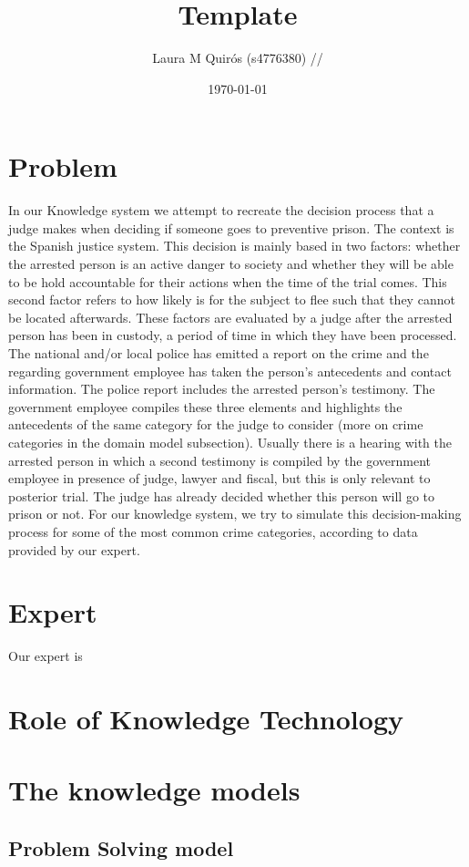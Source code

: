 \documentclass{article}
\title{Template}
\author{Laura M Quirós (s4776380) //}
\date{\today}
\begin{document}
\maketitle

\section{Problem}
In our Knowledge system we attempt to recreate the decision process that a judge makes when deciding if someone goes to preventive prison. The context is the Spanish justice system. This decision is mainly based in two factors: whether the arrested person is an active danger to society and whether they will be able to be hold accountable for their actions when the time of the trial comes. This second factor refers to how likely is for the subject to flee such that they cannot be located afterwards. 
These factors are evaluated by a judge after the arrested person has been in custody, a period of time in which they have been processed. The national and/or local police has emitted a report on the crime and the regarding government employee has taken the person's antecedents and contact information. The police report includes the arrested person's testimony.
The government employee compiles these three elements and highlights the antecedents of the same category for the judge to consider (more on crime categories in the domain model subsection). 
Usually there is a hearing with the arrested person in which a second testimony is compiled by the government employee in presence of judge, lawyer and fiscal, but this is only relevant to posterior trial. The judge has already decided whether this person will go to prison or not.
For our knowledge system, we try to simulate this decision-making process for some of the most common crime categories, according to data provided by our expert.

\section{Expert}
Our expert is \\
\section{Role of Knowledge Technology}
\section{The knowledge models}
\subsection{Problem Solving model}
\end{document}
